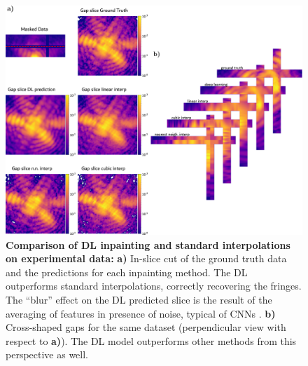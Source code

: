 
\begin{figure}[H]
    \centering
    \includegraphics[width=\textwidth]{figures/Inpainting/inslice_cross_interp.pdf}
    \caption{ \textbf{Comparison of DL inpainting and standard interpolations on experimental data:} \textbf{a)} In-slice 
    cut of the ground truth data and the predictions for each inpainting method. The DL outperforms standard interpolations, 
    correctly recovering the fringes. The ``blur'' effect on the DL predicted slice is the result of the averaging of features 
    in presence of noise, typical of CNNs \cite{Noise2Void}. \textbf{b)} Cross-shaped gaps for the same dataset (perpendicular 
    view with respect to \textbf{a)}). The DL model outperforms other methods from this perspective as well. }
    \label{fig:acc_int_3D}
\end{figure}

\newpage 


